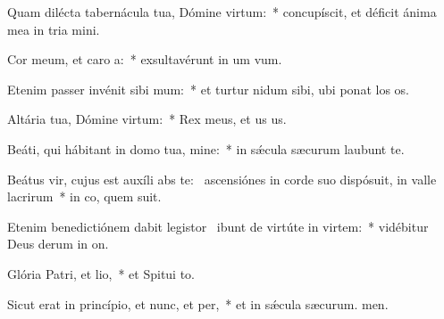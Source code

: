 \item Quam dilécta tabernácula tua, Dómine virtum:~* concupíscit, et déficit ánima mea in tria mini.
\item Cor meum, et caro a:~* exsultavérunt in um vum.
\item Etenim passer invénit sibi mum:~* et turtur nidum sibi, ubi ponat los os.
\item Altária tua, Dómine virtum:~* Rex meus, et us us.
\item Beáti, qui hábitant in domo tua, mine:~* in sǽcula sæcurum laubunt te.
\item Beátus vir, cujus est auxíli abs te:~\pscross{} ascensiónes in corde suo dispósuit, in valle lacrirum~* in co, quem suit.
\item Etenim benedictiónem dabit legistor~\pscross{} ibunt de virtúte in virtem:~* vidébitur Deus derum in on.
\item Glória Patri, et lio,~* et Spitui to.
\item Sicut erat in princípio, et nunc, et per,~* et in sǽcula sæcurum. men.
